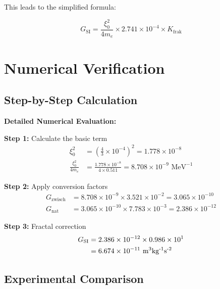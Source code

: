 \documentclass[12pt,a4paper]{article}
\begin{document}
	This leads to the simplified formula:
	
	\begin{equation}
		\boxed{G_{\text{SI}} = \frac{\xi_0^2}{4 m_e} \times 2.741 \times 10^{-4} \times K_{\text{frak}}}
	\end{equation}
	
	\section{Numerical Verification}
	
	\subsection{Step-by-Step Calculation}
	
	\begin{verification}
		\textbf{Detailed Numerical Evaluation:}
		
		\textbf{Step 1:} Calculate the basic term
		\begin{align}
			\xi_0^2 &= \left(\frac{4}{3} \times 10^{-4}\right)^2 = 1.778 \times 10^{-8} \\
			\frac{\xi_0^2}{4 m_e} &= \frac{1.778 \times 10^{-8}}{4 \times 0.511} = 8.708 \times 10^{-9} \text{ MeV}^{-1}
		\end{align}
		
		\textbf{Step 2:} Apply conversion factors
		\begin{align}
			G_{\text{zwisch}} &= 8.708 \times 10^{-9} \times 3.521 \times 10^{-2} = 3.065 \times 10^{-10} \\
			G_{\text{nat}} &= 3.065 \times 10^{-10} \times 7.783 \times 10^{-3} = 2.386 \times 10^{-12}
		\end{align}
		
		\textbf{Step 3:} Fractal correction
		\begin{align}
			G_{\text{SI}} &= 2.386 \times 10^{-12} \times 0.986 \times 10^{1} \\
			&= 6.674 \times 10^{-11} \text{ m\textsuperscript{3}kg\textsuperscript{-1}s\textsuperscript{-2}}
		\end{align}
	\end{verification}
	
	\subsection{Experimental Comparison}
	
\end{document}
